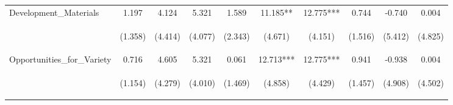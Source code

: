 \begin{tabular}{lccccccccc}
\noalign{\smallskip}Development_Materials & 1.197 & 4.124 & 5.321 & 1.589 & 11.185** & 12.775*** & 0.744 & -0.740 & 0.004\\
 & \begin{footnotesize}(1.358)\end{footnotesize} & \begin{footnotesize}(4.414)\end{footnotesize} & \begin{footnotesize}(4.077)\end{footnotesize} & \begin{footnotesize}(2.343)\end{footnotesize} & \begin{footnotesize}(4.671)\end{footnotesize} & \begin{footnotesize}(4.151)\end{footnotesize} & \begin{footnotesize}(1.516)\end{footnotesize} & \begin{footnotesize}(5.412)\end{footnotesize} & \begin{footnotesize}(4.825)\end{footnotesize}\\
\noalign{\smallskip}Opportunities_for_Variety & 0.716 & 4.605 & 5.321 & 0.061 & 12.713*** & 12.775*** & 0.941 & -0.938 & 0.004\\
 & \begin{footnotesize}(1.154)\end{footnotesize} & \begin{footnotesize}(4.279)\end{footnotesize} & \begin{footnotesize}(4.010)\end{footnotesize} & \begin{footnotesize}(1.469)\end{footnotesize} & \begin{footnotesize}(4.858)\end{footnotesize} & \begin{footnotesize}(4.429)\end{footnotesize} & \begin{footnotesize}(1.457)\end{footnotesize} & \begin{footnotesize}(4.908)\end{footnotesize} & \begin{footnotesize}(4.502)\end{footnotesize}\\

\end{tabular}
